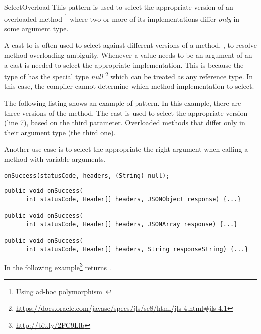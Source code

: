 \begin{pattern}{SelectOverload}
This pattern is used to select
the appropriate version of an overloaded method%
\footnote{Using ad-hoc polymorphism~\cite{stracheyFundamentalConceptsProgramming2000}}
where two or more of its implementations differ \emph{only} in some argument type.

A cast to  is often used to select against different versions
of a method, \ie{}, to resolve method overloading ambiguity.
Whenever a  value needs to be an argument of an a cast is
needed to select the appropriate implementation.
This is because the type of  has the special type \emph{null}%
\footnote{\url{https://docs.oracle.com/javase/specs/jls/se8/html/jls-4.html\#jls-4.1}}
which can be treated as any reference type.
In this case,
the compiler cannot determine which method implementation to select.

\instances{}
The following listing%
shows an example of \pname{} pattern.
In this example, there are three versions of the  method,
The cast  is used to select the appropriate version
(line 7), based on the third parameter.
Overloaded methods that differ only in their argument type (the third one).

Another use case is to select the appropriate the right argument when
calling a method with variable arguments.

\begin{verbatim}
onSuccess(statusCode, headers, (String) null);
\end{verbatim}

\begin{verbatim}
public void onSuccess(
      int statusCode, Header[] headers, JSONObject response) {...}

public void onSuccess(
      int statusCode, Header[] headers, JSONArray response) {...}

public void onSuccess(
      int statusCode, Header[] headers, String responseString) {...}
\end{verbatim}

In the following example\footnote{\url{http://bit.ly/2FC9Llb}}
 returns .


\end{pattern}

